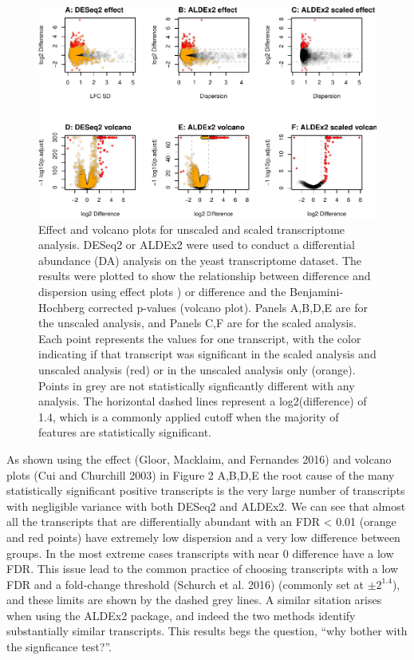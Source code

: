 \documentclass[
]{article}
\begin{document}
\begin{figure}
\centering
\includegraphics{go3_files/figure-latex/plot1-1.pdf}
\caption{Effect and volcano plots for unscaled and scaled transcriptome
analysis. DESeq2 or ALDEx2 were used to conduct a differential abundance
(DA) analysis on the yeast transcriptome dataset. The results were
plotted to show the relationship between difference and dispersion using
effect plots ) or difference and the Benjamini-Hochberg corrected
p-values (volcano plot). Panels A,B,D,E are for the unscaled analysis,
and Panels C,F are for the scaled analysis. Each point represents the
values for one transcript, with the color indicating if that transcript
was significant in the scaled analysis and unscaled analysis (red) or in
the unscaled analysis only (orange). Points in grey are not
statistically signficantly different with any analysis. The horizontal
dashed lines represent a log2(difference) of 1.4, which is a commonly
applied cutoff when the majority of features are statistically
significant.}
\end{figure}

As shown using the effect (Gloor, Macklaim, and Fernandes 2016) and
volcano plots (Cui and Churchill 2003) in Figure 2 A,B,D,E the root
cause of the many statistically significant positive transcripts is the
very large number of transcripts with negligible variance with both
DESeq2 and ALDEx2. We can see that almost all the transcripts that are
differentially abundant with an FDR \textless{} 0.01 (orange and red
points) have extremely low dispersion and a very low difference between
groups. In the most extreme cases transcripts with near 0 difference
have a low FDR. This issue lead to the common practice of choosing
transcripts with a low FDR and a fold-change threshold (Schurch et al.
2016) (commonly set at \(\pm 2^{1.4}\)), and these limits are shown by
the dashed grey lines. A similar sitation arises when using the ALDEx2
package, and indeed the two methods identify substantially similar
transcripts. This results begs the question, ``why bother with the
signficance test?''.
\end{document}
